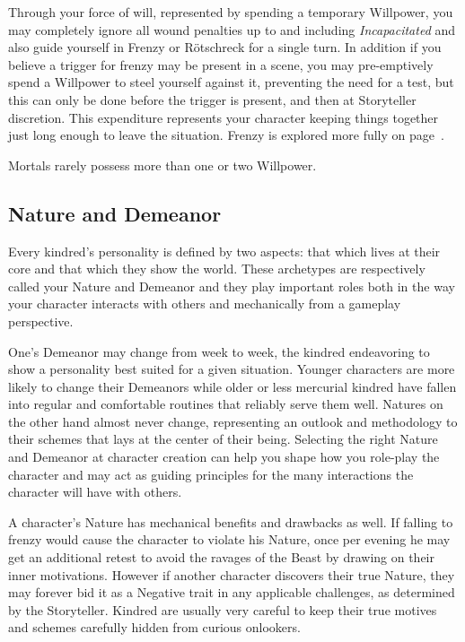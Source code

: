 Through your force of will, represented by spending a temporary Willpower, you may 
completely ignore all wound penalties up to and including \emph{Incapacitated} and 
also guide yourself in Frenzy or R\"{o}tschreck for a single turn.  In addition if 
you believe a trigger for frenzy may be present in a scene, you may pre-emptively 
spend a Willpower to steel yourself against it, preventing the need for a test, but 
this can only be done before the trigger is present, and then at Storyteller discretion.  
This expenditure represents your character keeping things together just 
long enough to leave the situation.  Frenzy is explored more fully on page~\pageref{subsec:frenzy}.

Mortals rarely possess more than one or two Willpower.

\subsection{Nature and Demeanor}
Every kindred's personality is defined by two aspects:  that which lives at their 
core and that which they show the world.  These archetypes are respectively called 
your Nature and Demeanor and they play important roles both in the way your character 
interacts with others and mechanically from a gameplay perspective.

One's Demeanor may change from week to week, the kindred endeavoring to show a 
personality best suited for a given situation.  Younger characters are more likely to 
change their Demeanors while older or less mercurial kindred have fallen into regular 
and comfortable routines that reliably serve them well.  Natures on the other hand 
almost never change, representing an outlook and methodology to their schemes 
that lays at the center of their being.  Selecting the right Nature and Demeanor at 
character creation can help you shape how you role-play the character and may act 
as guiding principles for the many interactions the character will have with others.

A character's Nature has mechanical benefits and drawbacks as well.  If falling to 
frenzy would cause the character to violate his Nature, once per evening he may
get an additional retest to avoid the ravages of the Beast by drawing on their inner 
motivations.  However if another character discovers their true Nature, they may forever 
bid it as a Negative trait in any applicable challenges, as determined by the Storyteller.  
Kindred are usually very careful to keep their true motives and schemes carefully hidden 
from curious onlookers.

